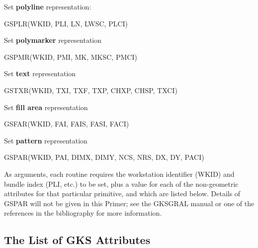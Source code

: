 Set {\bf polyline} representation:
\begin{XMP}
GSPLR(WKID, PLI, LN, LWSC, PLCI)
\end{XMP}
 
Set {\bf polymarker} representation
\begin{XMP}
GSPMR(WKID, PMI, MK, MKSC, PMCI)
\end{XMP}
 
Set {\bf text} representation
\begin{XMP}
GSTXR(WKID, TXI, TXF, TXP, CHXP, CHSP, TXCI)
\end{XMP}
 
Set {\bf fill area} representation
\begin{XMP}
GSFAR(WKID, FAI, FAIS, FASI, FACI)
\end{XMP}
 
Set {\bf pattern} representation
\begin{XMP}
GSPAR(WKID, PAI, DIMX, DIMY, NCS, NRS, DX, DY, PACI)
\end{XMP}
As arguments, each routine requires the workstation identifier (WKID)
and bundle index (PLI, etc.) to be set, plus a value for each of the
non-geometric attributes for that particular primitive,
and which are listed below.
Details of GSPAR will not be given in this Primer; see the GKSGRAL manual
or one of the references in the bibliography for more information.
\subsection{\protect\label{sec:attlst}The List of GKS Attributes}
